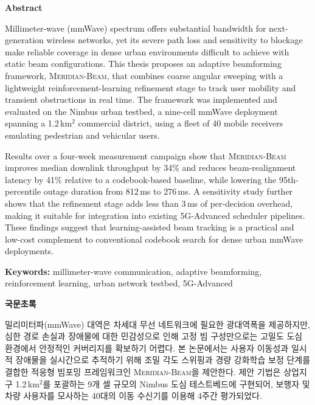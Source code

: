 \documentclass[12pt,a4paper]{report}
\begin{document}
\clearpage

\begin{center}
{\Large\bfseries\color{kucrimson} Abstract}
\end{center}
\kudivider
\vspace{0.4cm}

\noindent Millimeter-wave (mmWave) spectrum offers substantial bandwidth for
next-generation wireless networks, yet its severe path loss and sensitivity to
blockage make reliable coverage in dense urban environments difficult to
achieve with static beam configurations. This thesis proposes an adaptive
beamforming framework, \textsc{Meridian-Beam}, that combines coarse
angular sweeping with a lightweight reinforcement-learning refinement stage to
track user mobility and transient obstructions in real time. The framework was
implemented and evaluated on the Nimbus urban testbed, a nine-cell mmWave
deployment spanning a 1.2\,km$^2$ commercial district, using a fleet of 40
mobile receivers emulating pedestrian and vehicular users.

\vspace{0.3cm}
\noindent Results over a four-week measurement campaign show that
\textsc{Meridian-Beam} improves median downlink throughput by 34\% and
reduces beam-realignment latency by 41\% relative to a codebook-based
baseline, while lowering the 95th-percentile outage duration from 812\,ms to
276\,ms. A sensitivity study further shows that the refinement stage adds less
than 3\,ms of per-decision overhead, making it suitable for integration into
existing 5G-Advanced scheduler pipelines. These findings suggest that
learning-assisted beam tracking is a practical and low-cost complement to
conventional codebook search for dense urban mmWave deployments.

\vspace{0.4cm}
\noindent\textbf{Keywords:} millimeter-wave communication, adaptive
beamforming, reinforcement learning, urban network testbed, 5G-Advanced

\clearpage

\begin{center}
{\Large\bfseries\color{kucrimson} 국문초록}
\end{center}
\kudivider
\vspace{0.4cm}

\noindent 밀리미터파(mmWave) 대역은 차세대 무선 네트워크에 필요한 광대역폭을
제공하지만, 심한 경로 손실과 장애물에 대한 민감성으로 인해 고정 빔 구성만으로는
고밀도 도심 환경에서 안정적인 커버리지를 확보하기 어렵다. 본 논문에서는 사용자
이동성과 일시적 장애물을 실시간으로 추적하기 위해 조밀 각도 스위핑과 경량
강화학습 보정 단계를 결합한 적응형 빔포밍 프레임워크인 \textsc{Meridian-Beam}을
제안한다. 제안 기법은 상업지구 1.2\,km$^2$를 포괄하는 9개 셀 규모의 Nimbus
도심 테스트베드에 구현되어, 보행자 및 차량 사용자를 모사하는 40대의 이동
수신기를 이용해 4주간 평가되었다.
\end{document}
